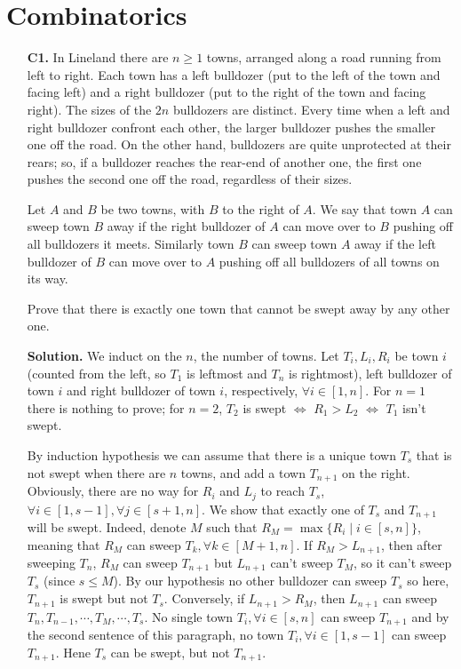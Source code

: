 \documentclass[11pt,a4paper]{article}
\begin{document}
\section*{Combinatorics}
\begin{enumerate}
\item[\textbf{C1.}] In Lineland there are $n\geq1$ towns, arranged along a road running from left to right. Each town has a left bulldozer (put to the left of the town and facing left) and a right bulldozer (put to the right of the town and facing right). The sizes of the $2n$ bulldozers are distinct. Every time when a left and right bulldozer confront each other, the larger bulldozer pushes the smaller one off the road. On the other hand, bulldozers are quite unprotected at their rears; so, if a bulldozer reaches the rear-end of another one, the first one pushes the second one off the road, regardless of their sizes.

Let $A$ and $B$ be two towns, with $B$ to the right of $A$. We say that town $A$ can sweep town $B$ away if the right bulldozer of $A$ can move over to $B$ pushing off all bulldozers it meets. Similarly town $B$ can sweep town $A$ away if the left bulldozer of $B$ can move over to $A$ pushing off all bulldozers of all towns on its way.

Prove that there is exactly one town that cannot be swept away by any other one.

\textbf{Solution.} We induct on the $n$, the number of towns. Let $T_i, L_i, R_i$ be town $i$ (counted from the left, so $T_1$ is leftmost and $T_n$ is rightmost), left bulldozer of town $i$ and right bulldozer of town $i$, respectively, $\forall i\in[1,n]$. For $n=1$ there is nothing to prove; for $n=2$, $T_2$ is swept $\Leftrightarrow$ $R_1>L_2$ $\Leftrightarrow$ $T_1$ isn't swept.

By induction hypothesis we can assume that there is a unique town $T_s$ that is not swept when there are $n$ towns, and add a town $T_{n+1}$ on the right. Obviously, there are no way for $R_i$ and $L_j$ to reach $T_s$, $\forall i\in[1,s-1], \forall j\in [s+1, n]$. We show that exactly one of $T_s$ and $T_{n+1}$ will be swept. Indeed, denote $M$ such that $R_M=\max \{R_i\mid i\in [s, n]\}$, meaning that $R_M$ can sweep $T_k, \forall k\in[M+1, n]$. If $R_M>L_{n+1}$, then after sweeping $T_n$, $R_M$ can sweep $T_{n+1}$ but $L_{n+1}$ can't sweep $T_M$, so it can't sweep $T_s$ (since $s\le M$). By our hypothesis no other bulldozer can sweep $T_s$ so here, $T_{n+1}$ is swept but not $T_s$. Conversely, if $L_{n+1}>R_M$, then $L_{n+1}$ can sweep $T_n, T_{n-1},\cdots , T_{M},\cdots , T_{s}$. No single town $T_{i}, \forall i\in [s,n]$ can sweep $T_{n+1}$ and by the second sentence of this paragraph, no town $T_i, \forall i\in [1, s-1]$ can sweep $T_{n+1}$. Hene $T_{s}$ can be swept, but not $T_{n+1}$.


\end{enumerate}
\end{document}
